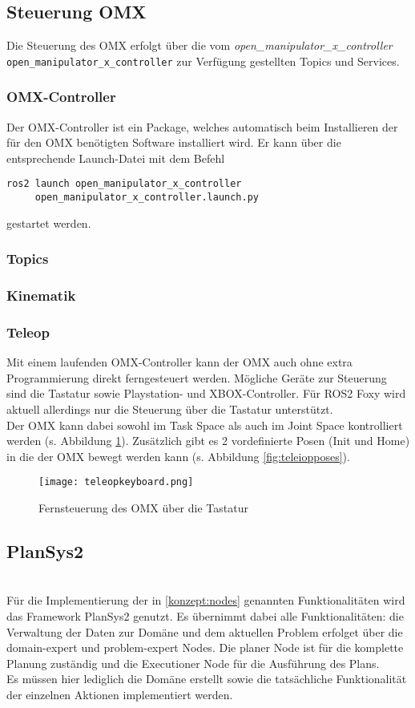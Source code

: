 \subsection{Steuerung OMX}
Die Steuerung des OMX erfolgt über die vom \emph{open\_manipulator\_x\_controller}\\ \verb|open_manipulator_x_controller| zur Verfügung gestellten Topics und Services.
\subsubsection{OMX-Controller}
Der OMX-Controller ist ein Package, welches automatisch beim Installieren der für den OMX benötigten Software installiert wird. Er kann über die entsprechende Launch-Datei mit dem Befehl
\begin{verbatim}
ros2 launch open_manipulator_x_controller 
     open_manipulator_x_controller.launch.py
\end{verbatim}
gestartet werden.
\subsubsection{Topics}
\subsubsection{Kinematik}
\subsubsection{Teleop} \label{teleop}
Mit einem laufenden OMX-Controller kann der OMX auch ohne extra Programmierung direkt ferngesteuert werden. Mögliche Geräte zur Steuerung sind die Tastatur sowie Playstation- und XBOX-Controller. Für \ac{ROS2} Foxy wird aktuell allerdings nur die Steuerung über die Tastatur unterstützt.\\
Der OMX kann dabei sowohl im Task Space als auch im Joint Space kontrolliert werden (s. Abbildung \ref{fig:teleopkeyboard}). Zusätzlich gibt es 2 vordefinierte Posen (Init und Home) in die der OMX bewegt werden kann (s. Abbildung \ref{fig:teleiopposes}).
\begin{figure}[ht!]
\centering
\texttt{[image: teleopkeyboard.png]}
\caption{Fernsteuerung des OMX über die Tastatur}
\label{fig:teleopkeyboard}
\end{figure}
\subsection{PlanSys2}
\cite{plansys}\\
Für die Implementierung der in \ref{konzept:nodes} genannten Funktionalitäten wird das Framework \ac{PlanSys2} genutzt. Es übernimmt dabei alle Funktionalitäten: die Verwaltung der Daten zur Domäne und dem aktuellen Problem erfolget über die domain-expert und problem-expert Nodes. Die planer Node ist für die komplette Planung zuständig und die Executioner Node für die Ausführung des Plans.\\
Es müssen hier lediglich die Domäne erstellt sowie die tatsächliche Funktionalität der einzelnen Aktionen implementiert werden.
